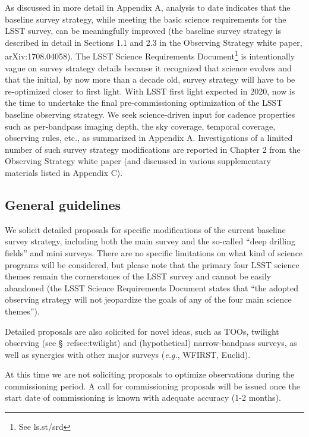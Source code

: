 \documentclass[DM,lsstdraft,toc,usenatbib]{lsstdoc}
\begin{document}
As discussed in more detail in Appendix A, analysis to date indicates that the baseline 
survey strategy, while meeting the basic science requirements for the LSST survey, can be meaningfully 
improved (the baseline survey strategy is described in detail in Sections 1.1 and 2.3 in the Observing Strategy
white paper, arXiv:1708.04058). The LSST Science Requirements Document\footnote{See ls.st/srd} 
is intentionally vague on survey strategy details because it recognized that science evolves and that the 
initial, by now more than a decade old, survey strategy will have to be re-optimized closer to first 
light. With LSST first light expected in 2020, now is the time to undertake the final pre-commissioning
optimization of the LSST baseline observing strategy. We seek science-driven input for cadence 
properties such as per-bandpass imaging depth, the sky coverage, temporal coverage, observing
rules, etc., as summarized in Appendix A. Investigations of a limited number of such survey strategy 
modifications are reported in Chapter 2 from the Observing Strategy white paper (and discussed 
in various supplementary materials listed in Appendix C). 


\subsection{General guidelines} 

We solicit detailed proposals for specific modifications of the current baseline survey strategy, including 
both the main survey and the so-called ``deep drilling fields'' and mini surveys. There are no 
specific limitations on what kind of science programs will be considered, but please note that 
the primary four LSST science themes remain the cornerstones of the LSST survey and cannot 
be easily abandoned (the LSST Science Requirements Document states that ``the adopted observing 
strategy will not jeopardize the goals of any of the four main science themes''). 

Detailed proposals are also solicited for novel ideas, such as TOOs, twilight observing (see \S~ref{sec:twilight}) and 
(hypothetical) narrow-bandpass surveys, as well as synergies with other major surveys ({\it e.g.}, WFIRST, Euclid). 

At this time we are not soliciting proposals to optimize observations during the commissioning period.
A call for commissioning proposals will be issued once the start date of commissioning is known with adequate accuracy (1-2 months). 
\end{document}
